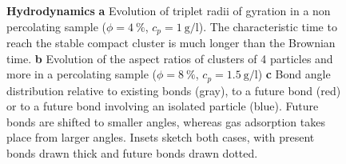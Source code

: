 \begin{figure}
	\caption{\textbf{Hydrodynamics} \textbf{a} Evolution of triplet radii of gyration in a non percolating sample ($\phi=4~\%$, $c_p=\SI{1}{\gram\per\litre}$). The characteristic time to reach the stable compact cluster is much longer than the Brownian time. \textbf{b} Evolution of the aspect ratios of clusters of 4 particles and more in a percolating sample ($\phi=8~\%$, $c_p=\SI{1.5}{\gram\per\litre}$) \textbf{c} Bond angle distribution relative to existing bonds (gray), to a future bond (red) or to a future bond involving an isolated particle (blue). Future bonds are shifted to smaller angles, whereas gas adsorption takes place from larger angles. Insets sketch both cases, with present bonds drawn thick and future bonds drawn dotted.}
	\label{fig:hydro}
\end{figure}
\tikzset{external/force remake=false}

